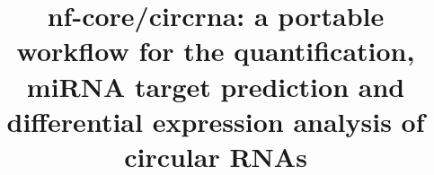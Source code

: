 \documentclass{bmcart}
\begin{document}
\begin{frontmatter}

\begin{fmbox}


\title{nf-core/circrna: a portable workflow for the quantification, miRNA target prediction and differential expression analysis of circular RNAs}


\author[
  addressref={aff1},                   %
    email={barry.digby@nuigalway.ie}  %
]{ }
\author[
  addressref={aff2},
  email={Stephen.Finn@tcd.ie}
]{ }
\author[
  addressref={aff1},
  email={pilib.obroin@nuigalway.ie}
]{ }



\address[id=aff1]{%
  ,             %
  ,          %
  ,                              %
}
\address[id=aff2]{%
  ,
  ,
  ,
}


\end{fmbox}
\end{frontmatter}
\end{document}
